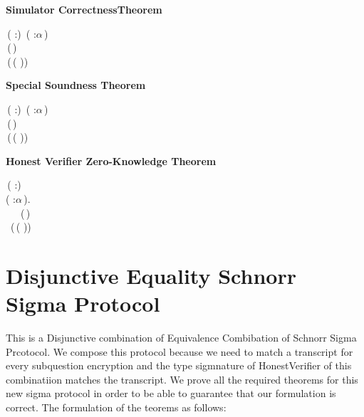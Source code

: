 \textbf{Simulator CorrectnessTheorem}
\begin{holmath}
    \,( :)\,\HOLSymConst{\HOLTokenConj{}}\,\,( :\ensuremath{\alpha}\,)\,\HOLSymConst{\HOLTokenConj{}}\,\,\,\HOLSymConst{\HOLTokenConj{}}\\
\,(\,)\,\HOLSymConst{=}\,\,\HOLSymConst{\HOLTokenImp{}}\\
\,(\,(\,\,))
\end{holmath}  

\textbf{Special Soundness Theorem}
\begin{holmath}
    \,( :)\,\HOLSymConst{\HOLTokenConj{}}\,\,( :\ensuremath{\alpha}\,)\,\HOLSymConst{\HOLTokenConj{}}\,\,\,\HOLSymConst{\HOLTokenConj{}}\\
\,(\,)\,\HOLSymConst{=}\,\,\HOLSymConst{\HOLTokenImp{}}\\
\,(\,(\,\,))
\end{holmath}  

\textbf{Honest Verifier Zero-Knowledge Theorem}
\begin{holmath}
    \,( :)\,\HOLSymConst{\HOLTokenImp{}}\\
\HOLSymConst{\HOLTokenForall{}}( :\ensuremath{\alpha}\,).\\
\,\,\,\,\HOLSymConst{\HOLTokenConj{}}\,\,\,\HOLSymConst{\HOLTokenConj{}}\,\,(\,)\,\HOLSymConst{=}\,\,\HOLSymConst{\HOLTokenImp{}}\\
\,\,\,(\,(\,\,))
\end{holmath}  

\newpage
\section{Disjunctive Equality Schnorr Sigma Protocol}
This is a Disjunctive combination of Equivalence Combibation of Schnorr Sigma Prcotocol.
We compose this protocol because we need to match a transcript for every subquestion encryption 
and the type sigmnature of HonestVerifier of this combinatiion matches the 
transcript. We prove all the required theorems for this new sigma protocol in order to be 
able to guarantee that our formulation is correct. 
The formulation of the teorems as follows:

